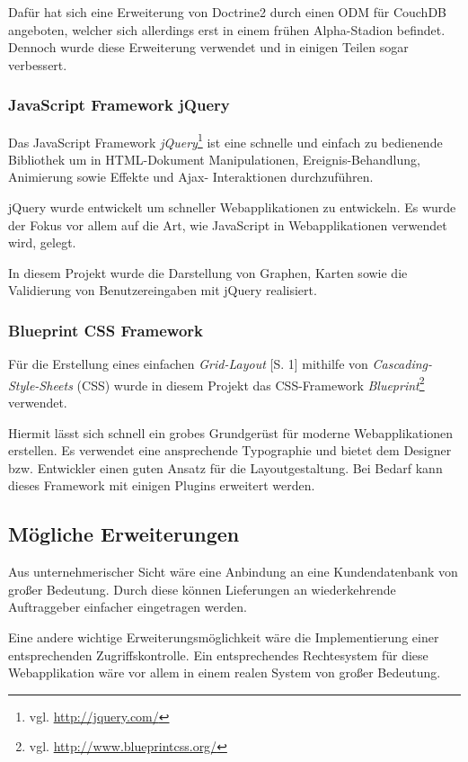 Dafür hat sich eine Erweiterung von Doctrine2 durch einen ODM für CouchDB
	angeboten, welcher sich allerdings erst in einem frühen Alpha-Stadion befindet.
	Dennoch wurde diese Erweiterung verwendet und in einigen Teilen sogar
	verbessert.

\subsubsection{JavaScript Framework jQuery}
Das JavaScript Framework \emph{jQuery}\footnote{vgl. \url{http://jquery.com/}}
	ist eine schnelle und einfach zu bedienende Bibliothek um in HTML-Dokument
	Manipulationen,	Ereignis-Behandlung, Animierung sowie Effekte und Ajax-
	Interaktionen durchzuführen.
	
jQuery wurde entwickelt um schneller Webapplikationen zu entwickeln. Es wurde der
	Fokus vor allem auf die Art, wie JavaScript in Webapplikationen verwendet wird,
	gelegt.
	
In diesem Projekt wurde die Darstellung von Graphen, Karten sowie die Validierung von
	Benutzereingaben mit jQuery realisiert.

\subsubsection{Blueprint CSS Framework}
Für die Erstellung eines einfachen \emph{Grid-Layout} \cite{W3C11}[S. 1] mithilfe von
	\emph{Cascading-Style-Sheets} (CSS) wurde in diesem Projekt das CSS-Framework
	\emph{Blueprint}\footnote{vgl. \url{http://www.blueprintcss.org/}} verwendet.
	
Hiermit lässt sich schnell ein grobes Grundgerüst für moderne Webapplikationen
	erstellen. Es verwendet eine ansprechende Typographie und bietet dem Designer
	bzw. Entwickler einen guten Ansatz für die Layoutgestaltung. Bei Bedarf kann
	dieses Framework mit einigen Plugins erweitert werden.

\subsection{Mögliche Erweiterungen}

Aus unternehmerischer Sicht wäre eine Anbindung an eine Kundendatenbank von
	großer Bedeutung. Durch diese können Lieferungen an wiederkehrende Auftraggeber
	einfacher eingetragen werden.
	
Eine andere wichtige Erweiterungsmöglichkeit wäre die Implementierung einer
	entsprechenden Zugriffskontrolle. Ein entsprechendes Rechtesystem für diese
	Webapplikation wäre vor allem in einem realen System von großer Bedeutung.

